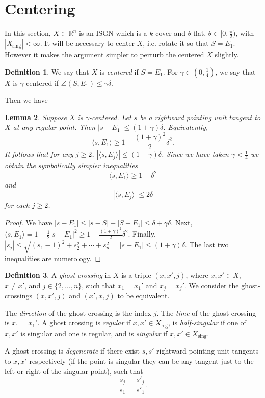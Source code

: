 \documentclass[11pt,reqno,twoside]{amsart}
\newcommand{\reg}{\mathrm{reg}}
\newcommand{\sing}{\mathrm{sing}}
\newtheorem{lemma}{Lemma}
\theoremstyle{definition}
\newtheorem{definition}[lemma]{Definition}
\begin{document}
\section{Centering}
\label{sec:centering}

In this section, $X \subset \mathbb{R}^n$ is an ISGN which is a $k$-cover and $\theta$-flat, $\theta \in [0,\frac{\pi}{2})$, with $|X_\sing| < \infty.$ It will be necessary to center $X$, i.e. rotate it so that $S = E_1$. However it makes the argument simpler to perturb the centered $X$ slightly.

\begin{definition}
    We say that $X$ is \emph{centered} if $S = E_1$. For $\gamma \in (0,\frac{1}{4})$, we say that $X$ is $\gamma$-centered if $\angle( S,E_1) \leq \gamma \delta.$
\end{definition}

Then we have

\begin{lemma} \label{almost-centered-slope-bounds}
    Suppose $X$ is $\gamma$-centered. Let $s$ be a rightward pointing unit tangent to $X$ at any regular point. Then $|s-E_1| \leq (1+\gamma)\delta$. Equivalently, 
    \[\langle s,E_1\rangle \geq 1 - \frac{(1+\gamma)^2}{2}\delta^2.\]
    It follows that for any $j \geq 2$, $|\langle s,E_j\rangle| \leq (1+\gamma)\delta$. Since we have taken $\gamma < \frac{1}{4}$ we obtain the symbolically simpler inequalities
    \[\langle s,E_1\rangle \geq 1-\delta^2\]
    and
    \[|\langle s,E_j\rangle| \leq 2\delta\]
    for each $j \geq 2$.
\end{lemma}

\begin{proof}
    We have $|s-E_1| \leq |s-S|+|S-E_1| \leq \delta + \gamma \delta.$ Next, $\langle s,E_1\rangle =1 - \frac{1}{2}|s-E_1|^2 \geq 1 - \frac{(1+\gamma)^2}{2}\delta^2$. Finally, $|s_j| \leq \sqrt{(s_1-1)^2 + s_2^2 + \cdots + s_n^2} = |s-E_1| \leq (1+\gamma)\delta.$ The last two inequalities are numerology.
\end{proof}

\begin{definition}
A \emph{ghost-crossing} in $X$ is a triple $(x,x',j)$, where $x,x' \in X$, $x \neq x'$, and $j \in \{2,\ldots, n\}$, such that $x_1 = x_1'$ and $x_j = x_j'$. We consider the ghost-crossings $(x,x',j)$ and $(x',x,j)$ to be equivalent.

The \emph{direction} of the ghost-crossing is the index $j$. The \emph{time} of the ghost-crossing is $x_1=x_1'$. A ghost crossing is \emph{regular} if $x,x' \in X_\reg$, is \emph{half-singular} if one of $x,x'$ is singular and one is regular, and is \emph{singular} if $x,x' \in X_\sing$.

A ghost-crossing is \emph{degenerate} if there exist $s,s'$ rightward pointing unit tangents to $x,x'$ respectively (if the point is singular they can be any tangent just to the left or right of the singular point), such that
\[\frac{s_j}{s_1} = \frac{s'_j}{s'_1}.\]
\end{definition}
\end{document}
